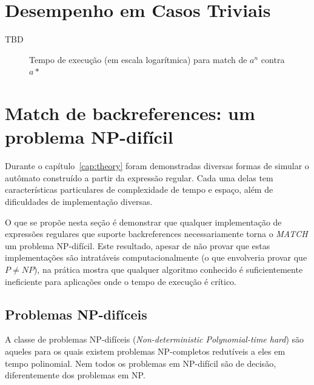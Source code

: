\documentclass[a4paper,12pt,oneside,onecolumn]{uerj}
\begin{document}
\section{Desempenho em Casos Triviais}

TBD

\begin{figure}[ht]
\centering
{}
\caption{Tempo de execução (em escala logarítmica) para match de $a^n$ contra $a*$}
\label{fig:graph_bench_2}
\end{figure}


\section{Match de backreferences: um problema NP-difícil}

Durante o capítulo~\ref{cap:theory} foram demonstradas diversas formas de simular o autômato construído a partir da expressão regular. Cada uma delas tem características particulares de complexidade de tempo e espaço, além de dificuldades de implementação diversas.

O que se propõe nesta seção é demonstrar que qualquer implementação de expressões regulares que suporte backreferences necessariamente torna o \emph{MATCH} um problema NP-difícil. Este resultado, apesar de não provar que estas implementações são intratáveis computacionalmente (o que envolveria provar que $P \neq NP$), na prática mostra que qualquer algoritmo conhecido é suficientemente ineficiente para aplicações onde o tempo de execução é crítico.

\subsection{Problemas NP-difíceis}

A classe de problemas NP-difíceis (\emph{Non-deterministic Polynomial-time hard}) são aqueles para os quais existem problemas NP-completos redutíveis a eles em tempo polinomial. Nem todos os problemas em NP-difícil são de decisão, diferentemente dos problemas em NP.
\end{document}
